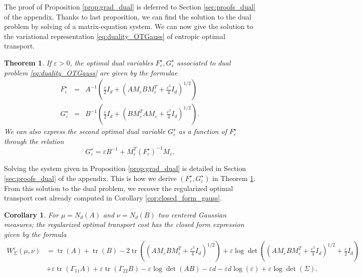 \documentclass[]{article}
\DeclareMathOperator{\tr}{tr}
\numberwithin{equation}{section}
\theoremstyle{plain}
\newtheorem{thm}{Theorem}[section]
\newtheorem{cor}{Corollary}[section]
\begin{document}
The proof of Proposition \ref{prop:grad_dual} is deferred to Section \ref{sec:proofs_dual} of the appendix. Thanks to last proposition, we can find the solution to the dual problem by solving of a matrix-equation system. We can now give the solution to the variational representation \eqref{eq:duality_OTGauss} of entropic optimal transport.
\begin{thm}\label{thm:optim_potentials}
 If $\varepsilon >0$, the optimal dual variables $F_\varepsilon^{\star}, G_\varepsilon^{\star}$ associated to dual problem \eqref{eq:duality_OTGauss} are given by the formulae
 \begin{equation}\label{eq:optim_dual}
     \begin{array}{ccc}
        F_\varepsilon^{\star} &= &  A^{-1}\left( \frac{\varepsilon}{2}I_d + \left(AM_{\varepsilon}BM_{\varepsilon}^T+ \frac{\varepsilon^2}{4}I_d  \right)^{1/2} \right)\\
        G_\varepsilon^{\star} &=  & B^{-1}\left( \frac{\varepsilon}{2}I_d + \left(BM_\varepsilon^T AM_{\varepsilon}+ \frac{\varepsilon^2}{4}I_d  \right)^{1/2} \right).
     \end{array}
 \end{equation}
We can also express the second optimal dual variable $G_\varepsilon^\star$ as a function of $F_\varepsilon^\star$ through the relation
 \begin{equation}
      G_\varepsilon^{\star} =  \varepsilon B^{-1}+ M_\varepsilon^{T}(F_\varepsilon^{\star})^{-1}M_\varepsilon.
 \end{equation}
\end{thm}
Solving the system given in Proposition \ref{prop:grad_dual} is detailed in Section \ref{sec:proofs_dual} of the appendix. This is how we derive $(F_\varepsilon^{\star}, G_{\varepsilon}^{\star})$ in Theorem \ref{thm:optim_potentials}.
From this solution to the dual problem, we recover the regularized optimal transport cost already computed in Corollary \ref{cor:closed_form_gauss}.

\begin{cor}\label{cor:eot_cost_dual}
For $\mu = N_d(A)$ and $\nu = N_d(B)$ two centered Gaussian measures; the regularized optimal transport cost has the closed form expression given by the formula
\begin{align}
    W_{\Sigma}^{\varepsilon}(\mu, \nu)& = \tr(A) + \tr(B) - 2 \tr\left( \left(AM_{\varepsilon}BM_{\varepsilon}^T+ \frac{\varepsilon^2}{4}I_d \right)^{1/2} \right) + \varepsilon \log \det\left( \left(AM_{\varepsilon}BM_{\varepsilon}^T+ \frac{\varepsilon^2}{4}I_d \right)^{1/2}+\frac{\varepsilon}{2}I_d  \right)  \nonumber \\
   &+\varepsilon  \tr (\Gamma_{11} A)  +\varepsilon \tr(\Gamma_{22} B) - \varepsilon \log \det(AB) - \varepsilon d - \varepsilon d \log(\varepsilon) + \varepsilon\log \det(\Sigma).
\end{align}
\end{cor}
\end{document}
